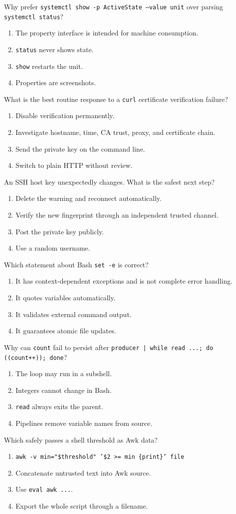 \documentclass[11pt,oneside,openany]{book}
\newcommand{\fourchoices}[4]{%
  \begin{enumerate}[label=\Alph*),leftmargin=2em,itemsep=0.25em]
    \item #1
    \item #2
    \item #3
    \item #4
  \end{enumerate}}
\begin{document}
\begin{questionbox}[title={Hard 31 -- systemd parsing}]
Why prefer \texttt{systemctl show -p ActiveState --value unit} over parsing \texttt{systemctl status}?
\fourchoices{The property interface is intended for machine consumption.}{\texttt{status} never shows state.}{\texttt{show} restarts the unit.}{Properties are screenshots.}
\end{questionbox}

\begin{questionbox}[title={Hard 32 -- TLS diagnosis}]
What is the best routine response to a \texttt{curl} certificate verification failure?
\fourchoices{Disable verification permanently.}{Investigate hostname, time, CA trust, proxy, and certificate chain.}{Send the private key on the command line.}{Switch to plain HTTP without review.}
\end{questionbox}

\begin{questionbox}[title={Hard 33 -- SSH host identity}]
An SSH host key unexpectedly changes. What is the safest next step?
\fourchoices{Delete the warning and reconnect automatically.}{Verify the new fingerprint through an independent trusted channel.}{Post the private key publicly.}{Use a random username.}
\end{questionbox}

\begin{questionbox}[title={Hard 34 -- Strict mode limits}]
Which statement about Bash \texttt{set -e} is correct?
\fourchoices{It has context-dependent exceptions and is not complete error handling.}{It quotes variables automatically.}{It validates external command output.}{It guarantees atomic file updates.}
\end{questionbox}

\begin{questionbox}[title={Hard 35 -- Loop state}]
Why can \texttt{count} fail to persist after \texttt{producer | while read ...; do ((count++)); done}?
\fourchoices{The loop may run in a subshell.}{Integers cannot change in Bash.}{\texttt{read} always exits the parent.}{Pipelines remove variable names from source.}
\end{questionbox}

\begin{questionbox}[title={Hard 36 -- Awk data injection}]
Which safely passes a shell threshold as Awk data?
\fourchoices{\texttt{awk -v min="\$threshold" '\$2 >= min \{print\}' file}}{Concatenate untrusted text into Awk source.}{Use \texttt{eval awk ...}.}{Export the whole script through a filename.}
\end{questionbox}
\end{document}
